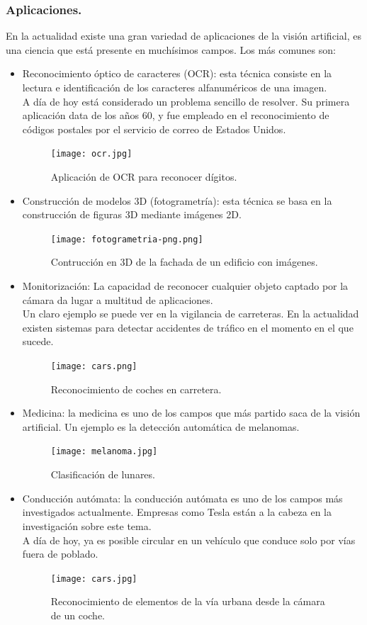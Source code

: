 \documentclass[a4paper,11pt]{article}
\begin{document}
\subsubsection{Aplicaciones.}
En la actualidad existe una gran variedad de aplicaciones de la visión artificial, es una ciencia que está presente en muchísimos campos. Los más comunes son:
\begin{itemize}
\item Reconocimiento óptico de caracteres (OCR): esta técnica consiste en la lectura e identificación de los caracteres alfanuméricos de una imagen.\\ 
\noindent
A día de hoy está considerado un problema sencillo de resolver. Su primera aplicación data de los años 60, y fue empleado en el reconocimiento de códigos postales por el servicio de correo de Estados Unidos.
\begin{figure}[H]
\centering
\texttt{[image: ocr.jpg]}
\caption{Aplicación de OCR para reconocer dígitos.}
\end{figure}
\item Construcción de modelos 3D (fotogrametría): esta técnica se basa en la construcción de figuras 3D mediante imágenes 2D.
\begin{figure}[H]
\centering
\texttt{[image: fotogrametria-png.png]}
\caption{Contrucción en 3D de la fachada de un edificio con imágenes.}
\end{figure}
\item Monitorización: La capacidad de reconocer cualquier objeto captado por la cámara da lugar a multitud de aplicaciones. \\
\noindent
Un claro ejemplo se puede ver en la vigilancia de carreteras. En la actualidad existen sistemas para detectar accidentes de tráfico en el momento en el que sucede.
\begin{figure}[H]
\centering
\texttt{[image: cars.png]}
\caption{Reconocimiento de coches en carretera.}
\end{figure}
\item Medicina: la medicina es uno de los campos que más partido saca de la visión artificial. Un ejemplo es la detección automática de melanomas.
\begin{figure}[H]
\centering
\texttt{[image: melanoma.jpg]}
\caption{Clasificación de lunares.}
\end{figure}
\item Conducción autómata: la conducción autómata es uno de los campos más investigados actualmente. Empresas como Tesla están a la cabeza en la investigación sobre este tema. \\
\noindent
A día de hoy, ya es posible circular en un vehículo que conduce solo por vías fuera de poblado.
\begin{figure}[H]
\centering
\texttt{[image: cars.jpg]}
\caption{Reconocimiento de elementos de la vía urbana desde la cámara de un coche.}
\end{figure}
\end{itemize}
\end{document}
